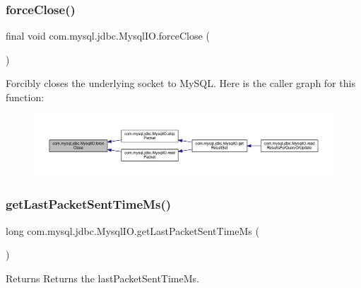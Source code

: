 \subsubsection{\texorpdfstring{force\+Close()}{forceClose()}}
{\footnotesize\ttfamily final void com.\+mysql.\+jdbc.\+Mysql\+I\+O.\+force\+Close (\begin{DoxyParamCaption}{ }\end{DoxyParamCaption})\hspace{0.3cm}{\ttfamily [protected]}}

Forcibly closes the underlying socket to My\+S\+QL. Here is the caller graph for this function\+:
\nopagebreak
\begin{figure}[H]
\begin{center}
\leavevmode
\includegraphics[width=350pt]{classcom_1_1mysql_1_1jdbc_1_1_mysql_i_o_a35b3e85f82755ba047023c6094ab5cd6_icgraph}
\end{center}
\end{figure}
\mbox{\label{classcom_1_1mysql_1_1jdbc_1_1_mysql_i_o_aa095242c04541a0fd380446e67d765d8}} 
\subsubsection{\texorpdfstring{get\+Last\+Packet\+Sent\+Time\+Ms()}{getLastPacketSentTimeMs()}}
{\footnotesize\ttfamily long com.\+mysql.\+jdbc.\+Mysql\+I\+O.\+get\+Last\+Packet\+Sent\+Time\+Ms (\begin{DoxyParamCaption}{ }\end{DoxyParamCaption})\hspace{0.3cm}{\ttfamily [protected]}}

\begin{DoxyReturn}{Returns}
Returns the last\+Packet\+Sent\+Time\+Ms. 
\end{DoxyReturn}
\mbox{\label{classcom_1_1mysql_1_1jdbc_1_1_mysql_i_o_a73c871988cf4c69bf78db472e6a7713f}} 

